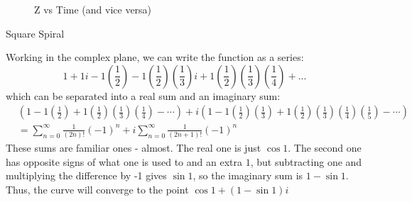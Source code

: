 \documentclass[11pt,answers]{exam}
\begin{document}
\begin{questions}
\begin{figure}[ht]
\centering
{}
\quad
{}
\caption{Z vs Time (and vice versa)}
\label{fig:figure}
\end{figure}

\question Square Spiral
\begin{solution}
Working in the complex plane, we can write the function as a series:
\[
1 + 1i - 1\left(\frac{1}{2}\right) - 1\left(\frac{1}{2}\right)\left(\frac{1}{3}\right)i + 1\left(\frac{1}{2}\right)\left(\frac{1}{3}\right)\left(\frac{1}{4}\right) + ...
\]
which can be separated into a real sum and an imaginary sum:
\begin{align*}
&\left(1 - 1\left(\frac{1}{2}\right) + 1\left(\frac{1}{2}\right)\left(\frac{1}{3}\right)\left(\frac{1}{4}\right) - \cdots \right) + i\left(1 - 1\left(\frac{1}{2}\right)\left(\frac{1}{3}\right) + 1\left(\frac{1}{2}\right)\left(\frac{1}{3}\right)\left(\frac{1}{4}\right)\left(\frac{1}{5}\right) - \cdots \right) \\
&= \sum_{n=0}^{\infty} \frac{1}{(2n)!}(-1)^n + i\sum_{n=0}^{\infty} \frac{1}{(2n+1)!}(-1)^n
\end{align*}
These sums are familiar ones - almost.  The real one is just $\cos{1}$.  The second one has opposite signs of what one is used to and an extra $1$, but subtracting one and multiplying the difference by -1 gives $\sin{1}$, so the imaginary sum is $1 - \sin{1}$.  Thus, the curve will converge to the point $\cos{1} + (1 - \sin{1})i$

\end{solution}

\end{questions}
\end{document}
